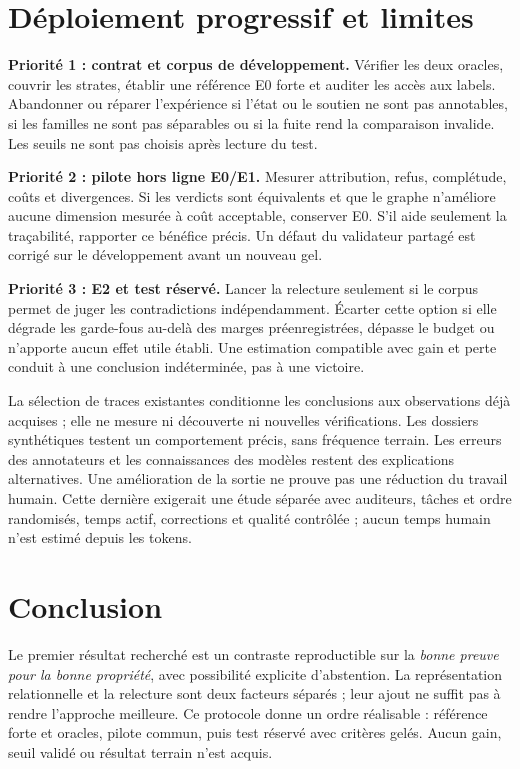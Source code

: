 \documentclass[11pt,a4paper]{article}
\begin{document}
\section{Déploiement progressif et limites}
\textbf{Priorité 1 : contrat et corpus de développement.} Vérifier les deux
oracles, couvrir les strates, établir une référence E0 forte et auditer les
accès aux labels. Abandonner ou réparer l'expérience si l'état ou le soutien ne
sont pas annotables, si les familles ne sont pas séparables ou si la fuite rend
la comparaison invalide. Les seuils ne sont pas choisis après lecture du test.

\textbf{Priorité 2 : pilote hors ligne E0/E1.} Mesurer attribution, refus,
complétude, coûts et divergences. Si les verdicts sont équivalents et que le
graphe n'améliore aucune dimension mesurée à coût acceptable, conserver E0.
S'il aide seulement la traçabilité, rapporter ce bénéfice précis. Un défaut du
validateur partagé est corrigé sur le développement avant un nouveau gel.

\textbf{Priorité 3 : E2 et test réservé.} Lancer la relecture seulement si le
corpus permet de juger les contradictions indépendamment. Écarter cette option
si elle dégrade les garde-fous au-delà des marges préenregistrées, dépasse le
budget ou n'apporte aucun effet utile établi. Une estimation compatible avec
gain et perte conduit à une conclusion indéterminée, pas à une victoire.

La sélection de traces existantes conditionne les conclusions aux observations
déjà acquises ; elle ne mesure ni découverte ni nouvelles vérifications. Les
dossiers synthétiques testent un comportement précis, sans fréquence terrain.
Les erreurs des annotateurs et les connaissances des modèles restent des
explications alternatives. Une amélioration de la sortie ne prouve pas une
réduction du travail humain. Cette dernière exigerait une étude séparée avec
auditeurs, tâches et ordre randomisés, temps actif, corrections et qualité
contrôlée ; aucun temps humain n'est estimé depuis les tokens.

\section{Conclusion}
Le premier résultat recherché est un contraste reproductible sur la \emph{bonne
preuve pour la bonne propriété}, avec possibilité explicite d'abstention.
La représentation relationnelle et la relecture sont deux facteurs séparés ;
leur ajout ne suffit pas à rendre l'approche meilleure. Ce protocole donne un
ordre réalisable : référence forte et oracles, pilote commun, puis test réservé
avec critères gelés. Aucun gain, seuil validé ou résultat terrain n'est acquis.
\end{document}
